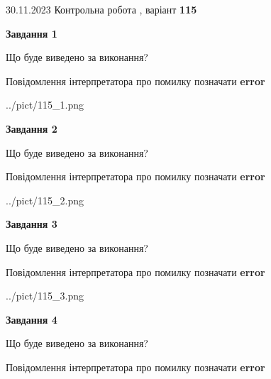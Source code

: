 \documentclass[12pt, ukrainian]{article}
\begin{document}
{{30.11.2023 Контрольна робота , варіант  \No \textbf { 115 }\par}}
{




{\begin {center}\textbf{Завдання 1}\end {center}}\par
Що буде виведено за виконання? \par
Повідомлення інтерпретатора про помилку позначати \textbf{error}

\begin{center}
	{../pict/115_1.png}
\end{center}
\newpage

{\begin {center}\textbf{Завдання 2}\end {center}}\par
Що буде виведено за виконання? \par
Повідомлення інтерпретатора про помилку позначати \textbf{error}

\begin{center}
	{../pict/115_2.png}
\end{center}
\newpage

{\begin {center}\textbf{Завдання 3}\end {center}}\par
Що буде виведено за виконання? \par
Повідомлення інтерпретатора про помилку позначати \textbf{error}

\begin{center}
	{../pict/115_3.png}
\end{center}
\newpage

{\begin {center}\textbf{Завдання 4}\end {center}}\par
Що буде виведено за виконання? \par
Повідомлення інтерпретатора про помилку позначати \textbf{error}

}
\end{document}
